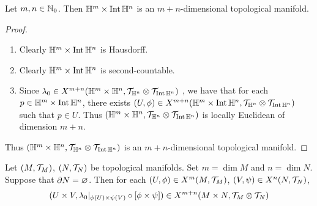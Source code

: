 \documentclass{book}
\begin{document}
\begin{ex} 
	Let $m, n \in \mathbb{N}_0$. Then $\mathbb{H}^m \times \operatorname{Int} \mathbb{H}^n$ is an $m+n$-dimensional topological manifold.
\end{ex}

\begin{proof} \
	\begin{enumerate}
		\item Clearly $\mathbb{H}^m \times \operatorname{Int} \mathbb{H}^n$ is Hausdorff.
		\item Clearly $\mathbb{H}^m \times \operatorname{Int} \mathbb{H}^n$ is second-countable.
		\item Since $\lambda_0 \in X^{m+n}(\mathbb{H}^m \times \mathbb{H}^n, \mathcal{T}_{\mathbb{H}^n} \otimes \mathcal{T}_{\operatorname{Int} \mathbb{H}^n})$ , we have that for each $p \in \mathbb{H}^m \times \operatorname{Int} \mathbb{H}^n$, there exists $(U, \phi) \in X^{m+n}(\mathbb{H}^m \times \operatorname{Int} \mathbb{H}^n, \mathcal{T}_{\mathbb{H}^n} \otimes \mathcal{T}_{\operatorname{Int} \mathbb{H}^n})$ such that $p \in U$. Thus $(\mathbb{H}^m \times \mathbb{H}^n, \mathcal{T}_{\mathbb{H}^n} \otimes \mathcal{T}_{\operatorname{Int} \mathbb{H}^n})$ is locally Euclidean of dimension $m+n$.
	\end{enumerate}
	Thus $(\mathbb{H}^m \times \mathbb{H}^n, \mathcal{T}_{\mathbb{H}^n} \otimes \mathcal{T}_{\operatorname{Int} \mathbb{H}^n})$ is an $m+n$-dimensional topological manifold.
\end{proof}


\begin{ex} 
	Let $(M, \mathcal{T}_M)$, $(N, \mathcal{T}_N)$ be topological manifolds. Set $m = \dim M$ and $n = \dim N$. Suppose that $\partial N = \varnothing$. Then for each $(U, \phi) \in X^m(M, \mathcal{T}_M)$, $(V, \psi) \in X^n(N, \mathcal{T}_N)$, 
	$$(U \times V, \lambda_0|_{\phi(U) \times \psi(V)} \circ [\phi \times \psi]) \in X^{m+n}(M \times N, \mathcal{T}_M \otimes \mathcal{T}_N)$$ 
\end{ex}
\end{document}
